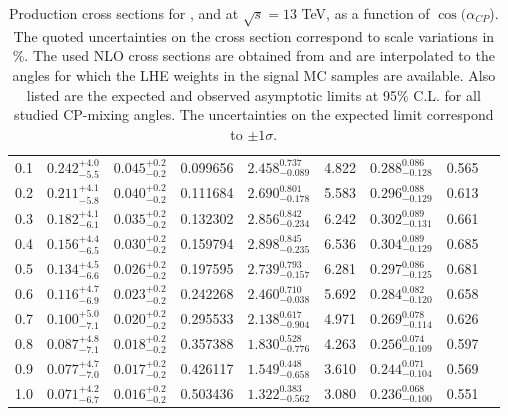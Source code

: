 \begin{table}[h!]
\begin{tabular}{lcccccccc}
    0.1              & $0.242^{+4.0}_{-5.5}$ & $0.045^{+0.2}_{-0.2}$ & 0.099656  & $2.458^{0.737}_{-0.089}$ & 4.822 & $0.288^{0.086}_{-0.128}$ & 0.565  \\
    0.2              & $0.211^{+4.1}_{-5.8}$ & $0.040^{+0.2}_{-0.2}$ & 0.111684  & $2.690^{0.801}_{-0.178}$ & 5.583 & $0.296^{0.088}_{-0.129}$ & 0.613  \\
    0.3              & $0.182^{+4.1}_{-6.1}$ & $0.035^{+0.2}_{-0.2}$ & 0.132302  & $2.856^{0.842}_{-0.234}$ & 6.242 & $0.302^{0.089}_{-0.131}$ & 0.661  \\
    0.4              & $0.156^{+4.4}_{-6.5}$ & $0.030^{+0.2}_{-0.2}$ & 0.159794  & $2.898^{0.845}_{-0.235}$ & 6.536 & $0.304^{0.089}_{-0.129}$ & 0.685  \\
    0.5              & $0.134^{+4.5}_{-6.6}$ & $0.026^{+0.2}_{-0.2}$ & 0.197595  & $2.739^{0.793}_{-0.157}$ & 6.281 & $0.297^{0.086}_{-0.125}$ & 0.681  \\
    0.6              & $0.116^{+4.7}_{-6.9}$ & $0.023^{+0.2}_{-0.2}$ & 0.242268  & $2.460^{0.710}_{-0.038}$ & 5.692 & $0.284^{0.082}_{-0.120}$ & 0.658  \\
    0.7              & $0.100^{+5.0}_{-7.1}$ & $0.020^{+0.2}_{-0.2}$ & 0.295533  & $2.138^{0.617}_{-0.904}$ & 4.971 & $0.269^{0.078}_{-0.114}$ & 0.626  \\
    0.8              & $0.087^{+4.8}_{-7.1}$ & $0.018^{+0.2}_{-0.2}$ & 0.357388  & $1.830^{0.528}_{-0.776}$ & 4.263 & $0.256^{0.074}_{-0.109}$ & 0.597  \\
    0.9              & $0.077^{+4.7}_{-7.0}$ & $0.017^{+0.2}_{-0.2}$ & 0.426117  & $1.549^{0.448}_{-0.658}$ & 3.610 & $0.244^{0.071}_{-0.104}$ & 0.569  \\
    1.0              & $0.071^{+4.2}_{-6.7}$ & $0.016^{+0.2}_{-0.2}$ & 0.503436  & $1.322^{0.383}_{-0.562}$ & 3.080 & $0.236^{0.068}_{-0.100}$ & 0.551  \\\hline
\end{tabular}
  \caption[Cross sections for \tHq, \tHW and \ttH as a function of $\cos(\alpha_{CP})$ ]{Production cross sections for \tHq, \tHW and \ttH at $\sqrt{s}=13$ TeV, as a function of $\cos(\alpha_{CP}$). The quoted uncertainties on the cross section correspond to scale variations in \%. The used \ttH NLO cross sections are obtained from \cite{maltoni2} and are interpolated to the angles for which the LHE weights in the signal MC samples are available. Also listed are the expected and observed asymptotic limits at 95\% C.L. for all studied CP-mixing angles. The uncertainties on the expected limit correspond to $\pm 1\sigma$.}\label{tab:cp_xsec}
\end{table}
